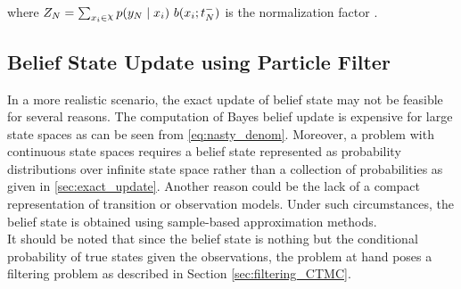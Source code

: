 where $ Z_{N} = \sum_{x_{i}\in \rchi} p(y_{N} \mid x_{i})\ b(x_{i}; t_{N}^{-}) $ is the normalization factor \cite{article}.

\subsection{Belief State Update using Particle Filter}
\label{sec:particle_filter}
In a more realistic scenario, the exact update of belief state may not be feasible for several reasons. The computation of Bayes belief update is expensive for large state spaces as can be seen from \autoref{eq:nasty_denom}. Moreover, a problem with continuous state spaces requires a belief state represented as probability distributions over infinite state space rather than a collection of probabilities as given in \cref{sec:exact_update}.\cite{Carlo1904} Another reason could be the lack of a compact representation of transition or observation models. Under such circumstances, the belief state is obtained using sample-based approximation methods.\cite{Carlo1904} \\
It should be noted that since the belief state is nothing but the conditional probability of true states given the observations, the problem at hand poses a filtering problem as described in Section \ref{sec:filtering_CTMC}.

